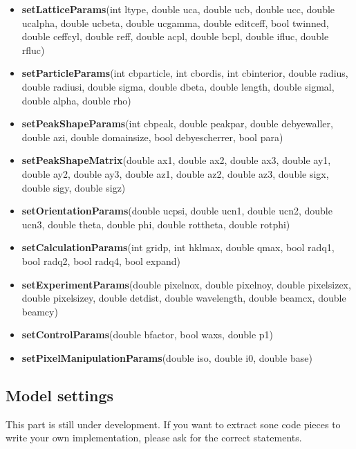 \documentclass[11pt]{article} %
\begin{document}
\begin{itemize}\itemsep0pt
\item {\bf setLatticeParams}(int ltype, double uca, double ucb, double ucc,
                          double ucalpha, double ucbeta, double ucgamma,
                          double editceff, bool twinned, double ceffcyl,
                          double reff, double acpl, double bcpl,
                          double ifluc, double rfluc)
\item {\bf setParticleParams}(int cbparticle, int cbordis, int cbinterior,
                           double radius, double radiusi, double sigma,
                           double dbeta, double length, double sigmal,
                           double alpha, double rho)
\item {\bf setPeakShapeParams}(int cbpeak, double peakpar, double debyewaller,
                            double azi, double domainsize, bool debyescherrer,
                            bool para)
\item {\bf setPeakShapeMatrix}(double ax1, double ax2, double ax3,
                            double ay1, double ay2, double ay3,
                            double az1, double az2, double az3,
                            double sigx, double sigy, double sigz)
\item {\bf setOrientationParams}(double ucpsi, double ucn1, double ucn2, double ucn3,
                              double theta, double phi, double rottheta, double rotphi)
\item {\bf setCalculationParams}(int gridp, int hklmax, double qmax, bool radq1,
                              bool radq2, bool radq4, bool expand)
\item {\bf setExperimentParams}(double pixelnox, double pixelnoy, double pixelsizex,
                             double pixelsizey, double detdist, double wavelength,
                             double beamcx, double beamcy)
\item {\bf setControlParams}(double bfactor, bool waxs, double p1)
\item {\bf setPixelManipulationParams}(double iso, double i0, double base)
\end{itemize}


\subsection{Model settings}

This part is still under development. If you want to extract sone code pieces to write your own implementation, please ask for the correct statements.
\end{document}

